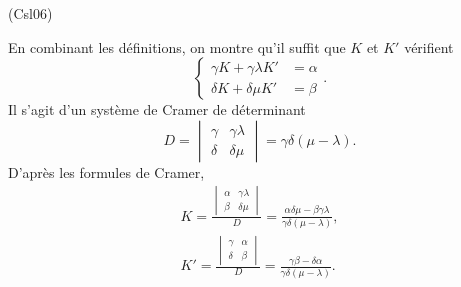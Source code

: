 \begin{tiny}(Csl06)\end{tiny} En combinant les définitions, on montre qu'il suffit que $K$ et $K'$ vérifient
\[
  \left\lbrace 
  \begin{aligned}
    \gamma K + \gamma \lambda K' &= \alpha \\
    \delta K + \delta\mu K' &= \beta
  \end{aligned}
\right. .
\]
Il s'agit d'un système de Cramer de déterminant
\[
  D = \begin{vmatrix}
    \gamma & \gamma \lambda \\ \delta & \delta \mu
  \end{vmatrix}
= \gamma \delta(\mu - \lambda).
\]
D'après les formules de Cramer,
\begin{multline*}
  K = 
  \frac{
  \begin{vmatrix}
    \alpha & \gamma \lambda \\ \beta & \delta \mu
  \end{vmatrix}  
  }{D}
  = \frac{\alpha \delta \mu - \beta \gamma \lambda}{\gamma \delta(\mu - \lambda)}, \\
K' = 
  \frac{
  \begin{vmatrix}
   \gamma  & \alpha \\ \delta & \beta
  \end{vmatrix}  
  }{D}
  = \frac{\gamma \beta  - \delta \alpha}{\gamma \delta(\mu - \lambda)}.
\end{multline*}
